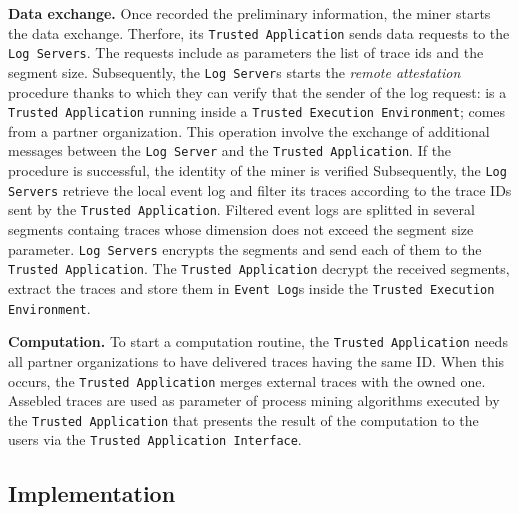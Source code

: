 \textbf{Data exchange.} Once recorded the preliminary information, the miner starts the data exchange. Therfore, its \texttt{Trusted Application} sends data requests to the \texttt{Log Servers}. The requests include as parameters the list of trace ids and the segment size. Subsequently, the \texttt{Log Server}s starts the \textit{remote attestation} procedure thanks to which they can verify that the sender of the log request: is a \texttt{Trusted Application} running inside a \texttt{Trusted Execution Environment}; comes from a partner organization. This operation involve the exchange of additional messages between the \texttt{Log Server} and the \texttt{Trusted Application}. If the procedure is successful, the identity of the miner is verified %
Subsequently, the \texttt{Log Servers} retrieve the local event log and filter its traces according to the trace IDs sent by the \texttt{Trusted Application}. Filtered event logs are splitted in several segments containg traces whose dimension does not exceed the segment size parameter. \texttt{Log Servers} encrypts the segments and send each of them to the \texttt{Trusted Application}. The \texttt{Trusted Application} decrypt the received segments, extract the traces and store them in \texttt{Event Log}s inside the \texttt{Trusted Execution Environment}.

\textbf{Computation.} To start a computation routine, the \texttt{Trusted Application} needs all partner organizations to have delivered traces having the same ID. When this occurs, the \texttt{Trusted Application} merges external traces with the owned one. Assebled traces are used as parameter of process mining algorithms executed by the \texttt{Trusted Application} that presents the result of the computation to the users via the \texttt{Trusted Application Interface}.
\subsection{Implementation}
